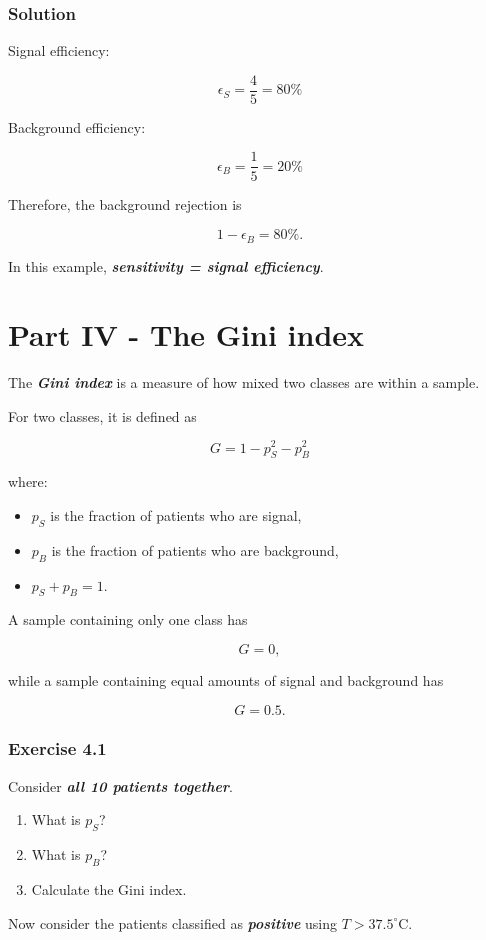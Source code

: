 \documentclass[10pt]{article}
\begin{document}
\subsubsection*{Solution}
Signal efficiency:

\[
\epsilon_S=\frac{4}{5}={80\%}
\]

Background efficiency:

\[
\epsilon_B=\frac{1}{5}={20\%}
\]

Therefore, the background rejection is

\[
1-\epsilon_B={80\%}.
\]

In this example, \textbf{\textit{sensitivity = signal efficiency}}.

\par\endgroup

\clearpage
\section*{Part IV - The Gini index}
The \textbf{\textit{Gini index}} is a measure of how mixed two classes are within a sample.

For two classes, it is defined as

\[
{
G = 1-p_S^2-p_B^2
}
\]

where:

\begin{itemize}
\item
$p_S$ is the fraction of patients who are signal,

\item
$p_B$ is the fraction of patients who are background,

\item
$p_S+p_B=1$.

\end{itemize}
A sample containing only one class has

\[
G=0,
\]

while a sample containing equal amounts of signal and background has

\[
G=0.5.
\]

\subsubsection*{Exercise 4.1}
Consider \textbf{\textit{all 10 patients together}}.

\begin{enumerate}
\item
What is $p_S$?

\item
What is $p_B$?

\item
Calculate the Gini index.

\end{enumerate}
Now consider the patients classified as \textbf{\textit{positive}} using $T>37.5^\circ\mathrm{C}$.
\end{document}
